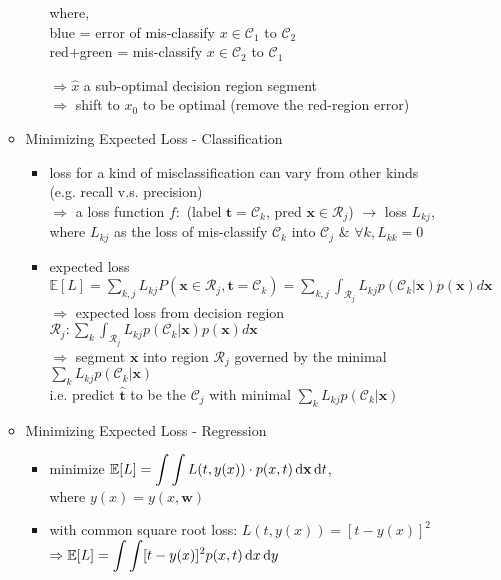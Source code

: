 \begin{itemize}
\begin{itemize}
\begin{itemize}
\begin{minipage}[l]{.5\linewidth}
		where, \\
		blue = error of mis-classify $x\in\mathcal C_1$ to $\mathcal C_2$ \\ 
		red+green = mis-classify $x\in\mathcal C_2$ to $\mathcal C_1$
		\end{minipage}
		$\Rightarrow \hat x$ a sub-optimal decision region segment \\
		$\Rightarrow$ shift to $x_0$ to be optimal (remove the red-region error)
		\end{itemize}
	\item Minimizing Expected Loss - Classification
		\begin{itemize}
		\item loss for a kind of misclassification can vary from other kinds \\
		(e.g. recall v.s. precision) \\
		$\Rightarrow$ a loss function $f:$ (label $\mathbf t=\mathcal C_k$, pred ${\mathbf x}\in\mathcal R_j$) $\rightarrow $ loss $L_{kj}$,  \\
		where $L_{kj}$ as the loss of mis-classify $\mathcal C_k$ into $\mathcal C_j$ \& $\forall k, L_{kk}=0$ \\
 		\item expected loss $\displaystyle \mathbb E[L] = \sum_{k,j}L_{kj}P(\mathbf x\in \mathcal R_{j}, \mathbf t=\mathcal C_k) = \sum_{k,j}\int_{\mathcal R_j}L_{kj} p(\mathcal C_k|\mathbf x)p(\mathbf x)d\mathbf x$ \\
		$\Rightarrow$ expected loss from decision region $\displaystyle \mathcal R_j: \sum_k \int_{\mathcal R_j}L_{kj} p(\mathcal C_k|\mathbf x)p(\mathbf x) d\mathbf x$ \\
		$\Rightarrow$ segment $\mathbf x$ into region $\mathcal R_j$ governed by the minimal $\displaystyle \sum_{k}L_{kj}p(\mathcal C_k|\mathbf x)$ \\
		i.e. predict $\hat{\mathbf t}$ to be the $\mathcal C_j$ with minimal $\displaystyle \sum_{k}L_{kj}p(\mathcal C_k|\mathbf x)$
		\end{itemize}
	\item Minimizing Expected Loss - Regression
		\begin{itemize}
		\item minimize $\displaystyle \mathbb E[L]=\int\int L(t, y(x))\cdot p(x, t) \mathop{}\!\mathrm{d}\mathbf x\mathop{}\!\mathrm{d} t$, \\
		where $y(x)=y(x, \mathbf w)$
		\item with common square root loss: $L(t, y(x))=[t-y(x)]^2$ \\
		$\displaystyle \Rightarrow \mathbb{E}[L] = \int\int[t-y(x)]^2p(x, t)\mathop{}\!\mathrm{d} x\mathop{}\!\mathrm{d} y$ \\

\end{itemize}
\end{itemize}
\end{itemize}
